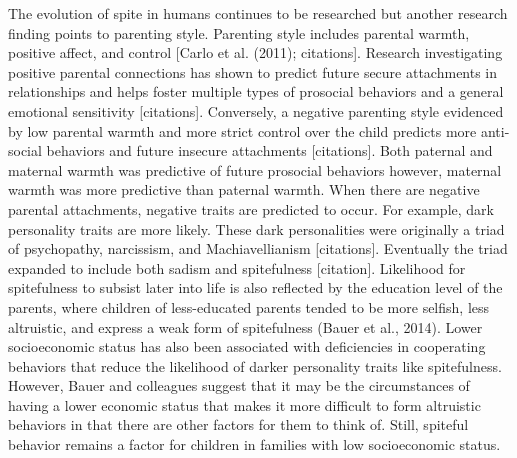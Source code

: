 \documentclass[
  english,
  donotrepeattitle,doc, 12pt, a4paper,floatsintext]{apa7}
\begin{document}
The evolution of spite in humans continues to be researched but another research finding points to parenting style. Parenting style includes parental warmth, positive affect, and control {[}Carlo et al. (2011); citations{]}. Research investigating positive parental connections has shown to predict future secure attachments in relationships and helps foster multiple types of prosocial behaviors and a general emotional sensitivity {[}citations{]}. Conversely, a negative parenting style evidenced by low parental warmth and more strict control over the child predicts more anti-social behaviors and future insecure attachments {[}citations{]}. Both paternal and maternal warmth was predictive of future prosocial behaviors however, maternal warmth was more predictive than paternal warmth. When there are negative parental attachments, negative traits are predicted to occur. For example, dark personality traits are more likely. These dark personalities were originally a triad of psychopathy, narcissism, and Machiavellianism {[}citations{]}. Eventually the triad expanded to include both sadism and spitefulness {[}citation{]}. Likelihood for spitefulness to subsist later into life is also reflected by the education level of the parents, where children of less-educated parents tended to be more selfish, less altruistic, and express a weak form of spitefulness (Bauer et al., 2014). Lower socioeconomic status has also been associated with deficiencies in cooperating behaviors that reduce the likelihood of darker personality traits like spitefulness. However, Bauer and colleagues suggest that it may be the circumstances of having a lower economic status that makes it more difficult to form altruistic behaviors in that there are other factors for them to think of. Still, spiteful behavior remains a factor for children in families with low socioeconomic status.
\end{document}
